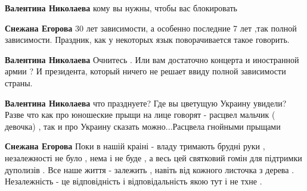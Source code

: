 \begin{itemize}
\begin{itemize}
\textbf{Валентина Николаева} кому вы нужны, чтобы вас блокировать

 
\textbf{Снежана Егорова} 30 лет зависимости, а особенно последние 7 лет ,так
полной зависимости. Праздник, как у некоторых язык поворачивается такое
говорить.

 
\textbf{Валентина Николаева} Очнитесь . Или вам достаточно концерта и иностранной армии ? И президента, который ничего не решает ввиду полной зависимости страны.

 
\textbf{Валентина Николаева} что празднуете? Где вы цветущую Украину увидели?
Разве что как про юношеские прыщи на лице говорят - расцвел мальчик ( девочка) , так и про Украину сказать можно...Расцвела гнойными прыщами 🥲

 
\textbf{Снежана Егорова} Поки в нашій краіні - владу тримають брудні руки , незалежності не було , нема і не буде , а весь цей святковий гомін для підтримки дуполизів . Все наше життя - залежить , навіть від кожного листочка з дерева . Незалежність - це відповідність і відповідальність якою тут і не тхне .

 

\end{itemize}
\end{itemize}
